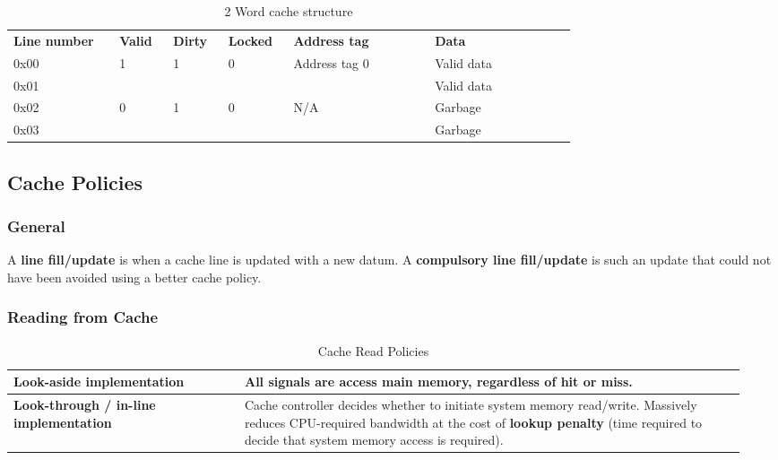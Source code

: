 			\begin{table}[H]
				\centering
				\begin{tabular}{p{0.15\linewidth}|p{0.06\linewidth}|p{0.06\linewidth}|p{0.06\linewidth}|p{0.2\linewidth}|p{0.2\linewidth}|}
					\cline{2-6}
						\textbf{Line number}
							& \textbf{Valid}
							& \textbf{Dirty}
							& \textbf{Locked}
							& \textbf{Address tag}
							& \textbf{Data}\\
					\cline{2-6}
						0x00
							& 1
							& 1
							& 0
							& Address tag 0
							& Valid data\\
					\cline{2-6}
						0x01
							& 
							& 
							& 
							& 
							& Valid data\\
					\cline{2-6}
						0x02
							& 0
							& 1
							& 0
							& N/A
							& Garbage\\
					\cline{2-6}
						0x03
							& 
							& 
							& 
							& 
							& Garbage\\
					\cline{2-6}
				\end{tabular}
				\caption{2 Word cache structure}
			\end{table}	

	\subsection{Cache Policies}
		\subsubsection{General}
			A \textbf{line fill/update} is when a cache line is updated with a new datum. A \textbf{compulsory line fill/update} is such an update that could not have been avoided using a better cache policy.
			
		\subsubsection{Reading from Cache}
			\begin{table}[H]
				\centering
				\begin{tabular}{|p{0.3\linewidth}|p{0.65\linewidth}|}
					\hline
					\textbf{Look-aside implementation}
						& All signals are access main memory, regardless of hit or miss.\\
					\hline
					\textbf{Look-through / in-line implementation}
						& Cache controller decides whether to initiate system memory read/write. Massively reduces CPU-required bandwidth at the cost of \textbf{lookup penalty} (time required to decide that system memory access is required). \\
					\hline
				\end{tabular}
				\caption{Cache Read Policies}
			\end{table}
			
